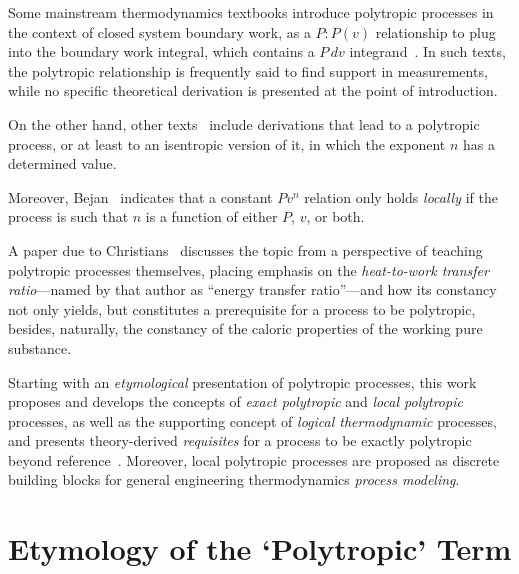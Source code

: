 \documentclass[fleqn,11pt]{SelfArx}
\begin{document}
    Some mainstream thermodynamics textbooks introduce polytropic processes in  the  context  of
    closed system boundary work, as a $P\!:\!P(v)$ relationship to plug into the  boundary  work
    integral,   which    contains    a    $P\,dv$    integrand~\cite{2013-CengelYA+BolesMA-AMGH,
    2002-MoranMJ+ShapiroHN-LTC, 1985-WylenG-Wiley}. In such texts, the  polytropic  relationship
    is frequently said to find support in measurements, while no specific theoretical derivation
    is presented at the point of introduction.

    On  the  other  hand,  other  texts~\cite{1986-JonesJB+HawkinsGA-Wiley,   2006-BejanA-Wiley,
    2015-KroosKA+PotterMC-Cengage} include derivations that lead to a polytropic process, or  at
    least to an isentropic version of it, in which the exponent $n$ has a determined value.

    Moreover, Bejan~\cite[p.~175]{2006-BejanA-Wiley} indicates that a constant  $Pv^n$  relation
    only holds \emph{locally} if the process is such that $n$ is a function of either $P$,  $v$,
    or both.

    A paper due to Christians~\cite{2012-ChristiansJ-IntJMechEngEduc} discusses the topic from a
    perspective  of  teaching  polytropic  processes  themselves,  placing   emphasis   on   the
    \emph{heat-to-work transfer ratio}---named by that author as ``energy transfer ratio''---and
    how its constancy not only yields, but constitutes  a  prerequisite  for  a  process  to  be
    polytropic, besides, naturally, the constancy of the caloric properties of the working  pure
    substance.

    Starting with  an  \emph{etymological}  presentation  of  polytropic  processes,  this  work
    proposes and develops the concepts of \emph{exact polytropic}  and  \emph{local  polytropic}
    processes, as well as the supporting concept of \emph{logical thermodynamic} processes,  and
    presents theory-derived \emph{requisites} for a process  to  be  exactly  polytropic  beyond
    reference~\cite{2012-ChristiansJ-IntJMechEngEduc}. Moreover, local polytropic processes  are
    proposed as discrete building blocks for general  engineering  thermodynamics  \emph{process
    modeling}.

\section{Etymology of the `Polytropic' Term}
\end{document}
